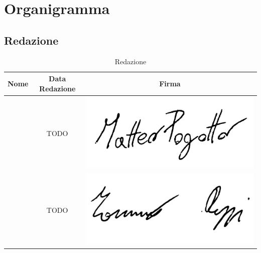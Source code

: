 \section{Organigramma}

\subsection{Redazione}

\renewcommand{\arraystretch}{1}
	\begin{table}[H]
		\begin{center}
			\setlength{\aboverulesep}{0pt}
			\setlength{\belowrulesep}{0pt}
			\setlength{\extrarowheight}{.75ex}
			\begin{tabular}{ c c c }
				\rowcolor{AzzurroGruppo!30} 
				\textbf{Nome} & \textbf{Data Redazione} & \textbf{Firma} \\
				\toprule
				
				\Matteo{} & TODO & \includegraphics[scale = 0.12]{components/img/firme_membri/firma-mp.png} \\
				\Tommaso{} & TODO & \includegraphics[scale = 0.5]{components/img/firme_membri/firma-tp.png} \\
				
				\bottomrule
			\end{tabular}
			\caption{Redazione}
		\end{center}
	\end{table}


